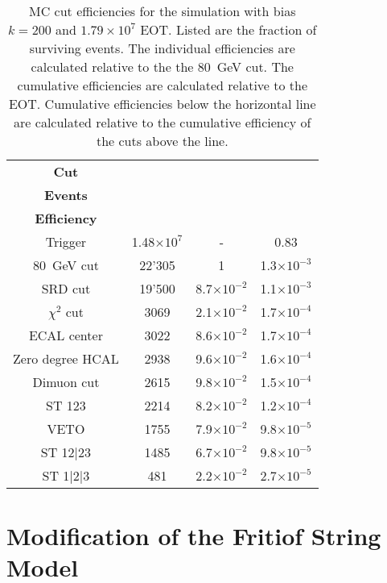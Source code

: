 \begin{table}[htbp]
	\centering
	\caption[MC cut efficiencies for the simulation with bias $k=200$ and $1.79\times10^7$ EOT.]{MC cut efficiencies for the simulation with bias $k=200$ and $1.79\times10^7$ EOT. Listed are the fraction of surviving events. The individual efficiencies are calculated relative to the the 80~GeV cut. The cumulative efficiencies are calculated relative to the EOT. Cumulative efficiencies below the horizontal line are calculated relative to the cumulative efficiency of the cuts above the line.}
	\begin{tabular}{|cccc|}
		\toprule
		\textbf{Cut} & \thead{\textbf{Surviving}\\\textbf{Events}} & \thead{\textbf{Efficiency}}& \thead{\textbf{Cumulative}\\\textbf{Efficiency}}\\
		\midrule
		Trigger & 1.48$\times10^{7}$ & - & 0.83\\ 
		80~GeV cut & 22'305 & 1 & 1.3$\times 10^{-3}$\\
		SRD cut & 19'500 & 8.7$\times 10^{-2}$ & 1.1$\times 10^{-3}$\\
		$\chi^2$ cut & 3069 & 2.1$\times 10^{-2}$ & 1.7$\times 10^{-4}$\\
		ECAL center & 3022 & 8.6$\times 10^{-2}$ & 1.7$\times 10^{-4}$\\
		Zero degree HCAL & 2938 & 9.6$\times 10^{-2}$ & 1.6$\times 10^{-4}$\\
		Dimuon cut & 2615 & 9.8$\times 10^{-2}$ & 1.5$\times 10^{-4}$\\
		\midrule
		ST 123 & 2214 & 8.2$\times 10^{-2}$ & 1.2$\times 10^{-4}$\\
		VETO & 1755 & 7.9$\times 10^{-2}$ & 9.8$\times 10^{-5}$\\
		ST 12|23 & 1485 & 6.7$\times 10^{-2}$ & 9.8$\times 10^{-5}$\\
		ST 1|2|3 & 481 & 2.2$\times 10^{-2}$ & 2.7$\times 10^{-5}$\\
		\bottomrule
	\end{tabular}
	\label{res:Tab:mccuts}
      \end{table}

\section{Modification of the Fritiof String Model}
\label{appC:sec:ftfp-modifications}      


